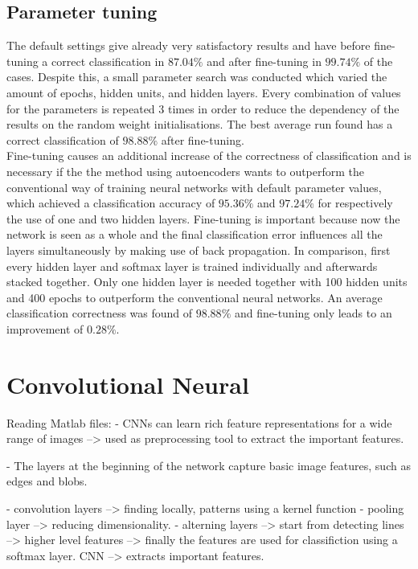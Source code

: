 \documentclass[a4paper,10pt]{article}
\begin{document}
\subsection{Parameter tuning}
The default settings give already very satisfactory results and have before fine-tuning a correct classification in $ 87.04\% $  and after fine-tuning in $ 99.74\% $ of the cases. Despite this, a small parameter search was conducted which varied the amount of epochs, hidden units, and hidden layers. Every combination of values for the parameters is repeated 3 times in order to reduce the dependency of the results on the random weight initialisations. The best average run found has a correct classification of $ 98.88\% $ after fine-tuning.\\

Fine-tuning causes an additional increase of the correctness of classification and is necessary if the the method using autoencoders wants to outperform the conventional way of training neural networks with default parameter values, which achieved a classification accuracy of $ 95.36\% $ and $ 97.24\%$ for respectively the use of one and two hidden layers. Fine-tuning is important because now the network is seen as a whole and the final classification error influences all the layers simultaneously by making use of back propagation. In comparison, first every hidden layer and softmax layer is trained individually and afterwards stacked together. Only one hidden layer is needed together with 100 hidden units and 400 epochs to outperform the conventional neural networks. An average classification correctness was found of $ 98.88\% $ and fine-tuning only leads to an improvement of $ 0.28\% $. 

\section{Convolutional Neural }

Reading Matlab files:
- CNNs can learn rich feature representations for a wide range of images --> used as preprocessing tool to extract the important features. 

- The layers at the beginning of the network capture basic image features, such as edges and blobs.

- convolution layers --> finding locally, patterns using a kernel function
- pooling layer --> reducing dimensionality. 
- alterning layers --> start from detecting lines --> higher level features --> finally the features are used for classifiction using a softmax layer. CNN --> extracts important features. 
\end{document}
